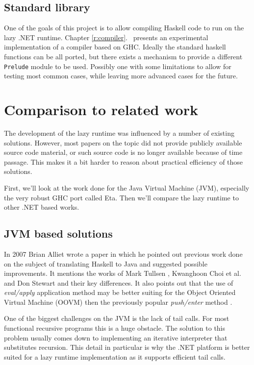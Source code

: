 \documentclass[en]{pracamgr}
\newcommand{\myref}[1]{\ref{#1}.~\nameref{#1}}
\begin{document}
\section{Standard library}

One of the goals of this project is to allow compiling
Haskell code to run on the lazy .NET runtime.
Chapter \myref{r:compiler} presents an experimental implementation
of a compiler based on GHC.
Ideally the standard haskell functions can be all ported,
but there exists a mechanism to provide a different \texttt{Prelude}
module to be used. Possibly one with some limitations
to allow for testing most common cases, while leaving
more advanced cases for the future.

\chapter{Comparison to related work}\label{r:alternatives}

The development of the lazy runtime was influenced by a
number of existing solutions. However, most papers on the
topic did not provide publicly available source code
material, or such source code is no longer available because
of time passage. This makes it a bit harder
to reason about practical efficiency of those solutions.

First, we'll look at the work done for the Java Virtual Machine (JVM),
especially the very robust GHC port called Eta.
Then we'll compare the lazy runtime to other .NET based works.

\section{JVM based solutions}

In 2007 Brian Alliet wrote a paper \cite{Alliet} in which
he pointed out previous work done on the subject of
translating Haskell to Java and suggested possible improvements.
It mentions the works of Mark Tullsen \cite{Tullsen},
Kwanghoon Choi et al. \cite{Choi}
and Don Stewart \cite{Stewart} and their key differences.
It also points out that the use of \textit{eval/apply} application method
may be better suiting for the Object Oriented Virtual Machine (OOVM)
then the previously popular \textit{push/enter} method
\cite{fastcurry}.

One of the biggest challenges on the JVM is the lack of
tail calls. For most functional recursive programs this
is a huge obstacle. The solution to this problem
usually comes down to implementing an iterative interpreter
that substitutes recursion. This detail in particular is 
why the .NET platform is better suited for a lazy runtime
implementation as it supports efficient tail calls.
\end{document}
